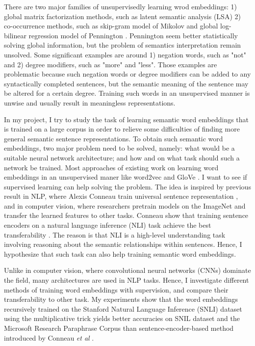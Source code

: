 \documentclass[10pt,twocolumn,letterpaper]{article}
\begin{document}
There are two major families of unsupervisedly learning wrod embeddings: 1) global matrix factorization methods, such as latent semantic analysis (LSA) \cite{deerwester1990indexing} 2) co-occurrence methods, such as skip-gram model of Mikolov  \cite{mikolov2013distributed} and global log-bilinear regression model of Pennington \etal \cite{pennington2014glove}. Pennington \etal seem better statistically solving global information, but the problem of semantics interpretation remain unsolved. Some significant examples are around 1) negation words, such as "not" and 2) degree modifiers, such as "more" and "less". Those examples are problematic because such negation words or degree modifiers can be added to any syntactically completed sentences, but the semantic meaning of the sentence may be altered for a certain degree. Training such words in an unsupervised manner is unwise and usually result in meaningless representations.

In my project, I try to study the task of learning semantic word embeddings that is trained on a large corpus in order to relieve some difficulties of finding more general semantic sentence representations. To obtain such semantic word embeddings, two major problem need to be solved, namely: what would be a suitable neural network architecture; and how and on what task should such a network be trained. Most approaches of existing work on learning word embeddings in an unsupervised maner like word2vec \cite{mikolov2013distributed} and GloVe \cite{pennington2014glove}. I want to see if supervised learning can help solving the problem. The idea is inspired by previous result in NLP, where Alexis Conneau \etal train universal sentence representation \cite{conneau2017supervised}, and in computer vision, where researchers pretrain models on the ImageNet \cite{deng2009imagenet} and transfer the learned features to other tasks. Conneau \etal show that training sentence encoders on a natural language inference (NLI) task achieve the best transferability \cite{conneau2017supervised}. The reason is that NLI is a high-level understanding task involving reasoning about the semantic relationships within sentences. Hence, I hypothesize that such task can also help training semantic word embeddings.

Unlike in computer vision, where convolutional neural networks (CNNs) dominate the field, many architectures are used in NLP tasks. Hence, I investigate different methods of training word embeddings with supervision, and compare their transferability to other task. My experiments show that the word embeddings recursively trained on the Stanford Natural Language Inference (SNLI) dataset \cite{bowman2015large} using the multiplicative trick yields better accuracies on  SNIL dataset and the Microsoft Research Paraphrase Corpus than sentence-encoder-based method introduced by Conneau \emph{et al} \cite{conneau2017supervised}.
\end{document}
